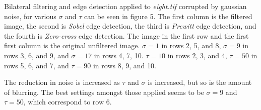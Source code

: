 \documentclass[11pt]{report}
\begin{document}
Bilateral filtering and edge detection applied to \textit{eight.tif} corrupted by gaussian noise, for various $\sigma$ and $\tau$ can be seen in figure 5. The first column is the filtered image, the second is \textit{Sobel} edge detection, the third is \textit{Prewitt} edge detection, and the fourth is \textit{Zero-cross} edge detection. The image in the first row and the first first column is the original unfiltered image. $\sigma = 1$ in rows 2, 5, and 8, $\sigma = 9$ in rows 3, 6, and 9, and $\sigma = 17$ in rows 4, 7, 10. $\tau = 10$ in rows 2, 3, and 4, $\tau = 50$ in rows 5, 6, and 7, and $\tau = 90$ in rows 8, 9, and 10.

The reduction in noise is increased as $\tau$ and $\sigma$ is increased, but so is the amount of blurring. The best settings amongst those applied seems to be $\sigma = 9$ and $\tau = 50$, which correspond to row 6.
\end{document}
